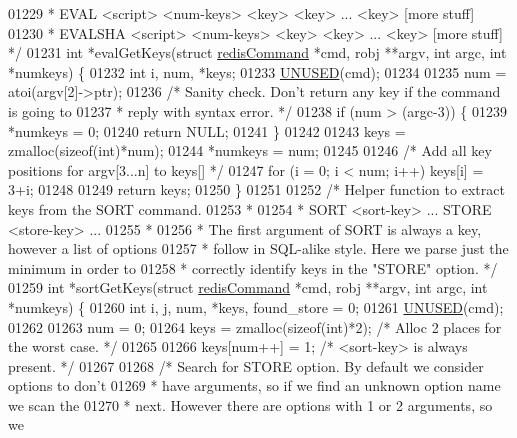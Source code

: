 \begin{DoxyCode}
01229 \textcolor{comment}{ * EVAL <script> <num-keys> <key> <key> ... <key> [more stuff]}
01230 \textcolor{comment}{ * EVALSHA <script> <num-keys> <key> <key> ... <key> [more stuff] */}
01231 \textcolor{keywordtype}{int} *evalGetKeys(\textcolor{keyword}{struct} \hyperlink{structredisCommand}{redisCommand} *cmd, robj **argv, \textcolor{keywordtype}{int} argc, \textcolor{keywordtype}{int} *numkeys) \{
01232     \textcolor{keywordtype}{int} i, num, *keys;
01233     \hyperlink{server_8h_ae7c9dc8f13568a9c856573751f1ee1ec}{UNUSED}(cmd);
01234 
01235     num = atoi(argv[2]->ptr);
01236     \textcolor{comment}{/* Sanity check. Don't return any key if the command is going to}
01237 \textcolor{comment}{     * reply with syntax error. */}
01238     \textcolor{keywordflow}{if} (num > (argc-3)) \{
01239         *numkeys = 0;
01240         \textcolor{keywordflow}{return} NULL;
01241     \}
01242 
01243     keys = zmalloc(\textcolor{keyword}{sizeof}(\textcolor{keywordtype}{int})*num);
01244     *numkeys = num;
01245 
01246     \textcolor{comment}{/* Add all key positions for argv[3...n] to keys[] */}
01247     \textcolor{keywordflow}{for} (i = 0; i < num; i++) keys[i] = 3+i;
01248 
01249     \textcolor{keywordflow}{return} keys;
01250 \}
01251 
01252 \textcolor{comment}{/* Helper function to extract keys from the SORT command.}
01253 \textcolor{comment}{ *}
01254 \textcolor{comment}{ * SORT <sort-key> ... STORE <store-key> ...}
01255 \textcolor{comment}{ *}
01256 \textcolor{comment}{ * The first argument of SORT is always a key, however a list of options}
01257 \textcolor{comment}{ * follow in SQL-alike style. Here we parse just the minimum in order to}
01258 \textcolor{comment}{ * correctly identify keys in the "STORE" option. */}
01259 \textcolor{keywordtype}{int} *sortGetKeys(\textcolor{keyword}{struct} \hyperlink{structredisCommand}{redisCommand} *cmd, robj **argv, \textcolor{keywordtype}{int} argc, \textcolor{keywordtype}{int} *numkeys) \{
01260     \textcolor{keywordtype}{int} i, j, num, *keys, found\_store = 0;
01261     \hyperlink{server_8h_ae7c9dc8f13568a9c856573751f1ee1ec}{UNUSED}(cmd);
01262 
01263     num = 0;
01264     keys = zmalloc(\textcolor{keyword}{sizeof}(\textcolor{keywordtype}{int})*2); \textcolor{comment}{/* Alloc 2 places for the worst case. */}
01265 
01266     keys[num++] = 1; \textcolor{comment}{/* <sort-key> is always present. */}
01267 
01268     \textcolor{comment}{/* Search for STORE option. By default we consider options to don't}
01269 \textcolor{comment}{     * have arguments, so if we find an unknown option name we scan the}
01270 \textcolor{comment}{     * next. However there are options with 1 or 2 arguments, so we}

\end{DoxyCode}
